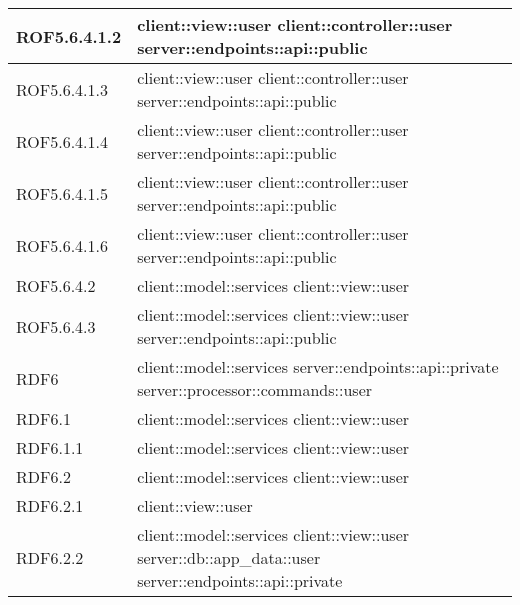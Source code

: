 \begin{center}
\begin{longtable}{| p{4cm} | p{8cm} |}
\hline
ROF5.6.4.1.2 & client::view::user \newline client::controller::user \newline server::endpoints::api::public \\
\hline
ROF5.6.4.1.3 & client::view::user \newline client::controller::user \newline server::endpoints::api::public \\
\hline
ROF5.6.4.1.4 & client::view::user \newline client::controller::user \newline server::endpoints::api::public \\
\hline
ROF5.6.4.1.5 & client::view::user \newline client::controller::user \newline server::endpoints::api::public \\
\hline
ROF5.6.4.1.6 & client::view::user \newline client::controller::user \newline server::endpoints::api::public \\
\hline
ROF5.6.4.2 & client::model::services \newline client::view::user \\
\hline
ROF5.6.4.3 & client::model::services \newline client::view::user \newline server::endpoints::api::public \\
\hline
RDF6 & client::model::services \newline server::endpoints::api::private \newline server::processor::commands::user \\
\hline
RDF6.1 & client::model::services \newline client::view::user \\
\hline
RDF6.1.1 & client::model::services \newline client::view::user \\
\hline
RDF6.2 & client::model::services \newline client::view::user \\
\hline
RDF6.2.1 & client::view::user \\
\hline
RDF6.2.2 & client::model::services \newline client::view::user \newline server::db::app\_data::user \newline server::endpoints::api::private \\

\end{longtable}
\end{center}
